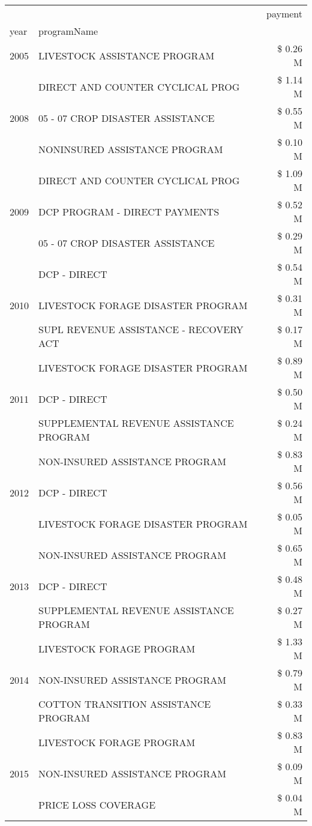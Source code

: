 \begin{tabular}{llr}
\toprule
 &  & payment \\
year & programName &  \\
\midrule
2005 & LIVESTOCK ASSISTANCE PROGRAM & \$ 0.26 M \\
\cline{1-3}
\multirow[t]{3}{*}{2008} & DIRECT AND COUNTER CYCLICAL PROG & \$ 1.14 M \\
 & 05 - 07 CROP DISASTER ASSISTANCE & \$ 0.55 M \\
 & NONINSURED ASSISTANCE PROGRAM & \$ 0.10 M \\
\cline{1-3}
\multirow[t]{3}{*}{2009} & DIRECT AND COUNTER CYCLICAL PROG & \$ 1.09 M \\
 & DCP PROGRAM - DIRECT PAYMENTS & \$ 0.52 M \\
 & 05 - 07 CROP DISASTER ASSISTANCE & \$ 0.29 M \\
\cline{1-3}
\multirow[t]{3}{*}{2010} & DCP - DIRECT & \$ 0.54 M \\
 & LIVESTOCK FORAGE DISASTER PROGRAM & \$ 0.31 M \\
 & SUPL REVENUE ASSISTANCE - RECOVERY ACT & \$ 0.17 M \\
\cline{1-3}
\multirow[t]{3}{*}{2011} & LIVESTOCK FORAGE DISASTER PROGRAM & \$ 0.89 M \\
 & DCP - DIRECT & \$ 0.50 M \\
 & SUPPLEMENTAL REVENUE ASSISTANCE PROGRAM & \$ 0.24 M \\
\cline{1-3}
\multirow[t]{3}{*}{2012} & NON-INSURED ASSISTANCE PROGRAM & \$ 0.83 M \\
 & DCP - DIRECT & \$ 0.56 M \\
 & LIVESTOCK FORAGE DISASTER PROGRAM & \$ 0.05 M \\
\cline{1-3}
\multirow[t]{3}{*}{2013} & NON-INSURED ASSISTANCE PROGRAM & \$ 0.65 M \\
 & DCP - DIRECT & \$ 0.48 M \\
 & SUPPLEMENTAL REVENUE ASSISTANCE PROGRAM & \$ 0.27 M \\
\cline{1-3}
\multirow[t]{3}{*}{2014} & LIVESTOCK FORAGE PROGRAM & \$ 1.33 M \\
 & NON-INSURED ASSISTANCE PROGRAM & \$ 0.79 M \\
 & COTTON TRANSITION ASSISTANCE PROGRAM & \$ 0.33 M \\
\cline{1-3}
\multirow[t]{3}{*}{2015} & LIVESTOCK FORAGE PROGRAM & \$ 0.83 M \\
 & NON-INSURED ASSISTANCE PROGRAM & \$ 0.09 M \\
 & PRICE LOSS COVERAGE & \$ 0.04 M \\

\end{tabular}
